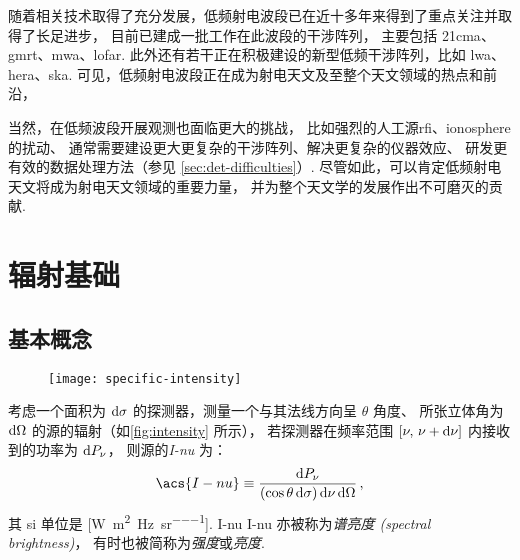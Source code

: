 随着相关技术取得了充分发展，低频射电波段已在近十多年来得到了重点关注并取得了长足进步，
目前已建成一批工作在此波段的干涉阵列，
主要包括 \ac{21cma}、\ac{gmrt}、\ac{mwa}、\ac{lofar}.
此外还有若干正在积极建设的新型低频干涉阵列，比如 \ac{lwa}、\ac{hera}、\ac{ska}.
可见，低频射电波段正在成为射电天文及至整个天文领域的热点和前沿，

当然，在低频波段开展观测也面临更大的挑战，
比如强烈的人工源\ac{rfi}、\ac{ionosphere}的扰动、
通常需要建设更大更复杂的干涉阵列、解决更复杂的仪器效应、
研发更有效的数据处理方法（参见 \autoref{sec:det-difficulties}）.
尽管如此，可以肯定低频射电天文将成为射电天文领域的重要力量，
并为整个天文学的发展作出不可磨灭的贡献.


\section{辐射基础}
\label{sec:radiation}

\subsection{基本概念}

\begin{figure}[htp]
  \centering
  \texttt{[image: specific-intensity]}
  \label{fig:intensity}
\end{figure}

考虑一个面积为 $\mathrm{d}\sigma$ 的探测器，测量一个与其法线方向呈 $\theta$ 角度、
所张立体角为 $\mathrm{d}\Omega$ 的源的辐射（如\autoref{fig:intensity} 所示），
若探测器在频率范围 $[\nu, \,\nu+\mathrm{d}\nu]$ 内接收到的功率为 $\mathrm{d}P_{\nu}$，
则源的\emph{\acf{I-nu}} 为：
\begin{equation}
  \label{eq:intensity}
  \acs{I-nu} \equiv
    \frac{\D{P_{\nu}}}{(\cos\theta\,\D{\sigma}) \,\D{\nu} \,\D{\Omega}} \,,
\end{equation}
其 \ac{si} 单位是 [\si{\watt\per\square\meter\per\hertz\per\steradian}].
\acl{I-nu} \acs{I-nu} 亦被称为\emph{谱亮度 (spectral brightness)}，
有时也被简称为\emph{强度}或\emph{亮度}.

